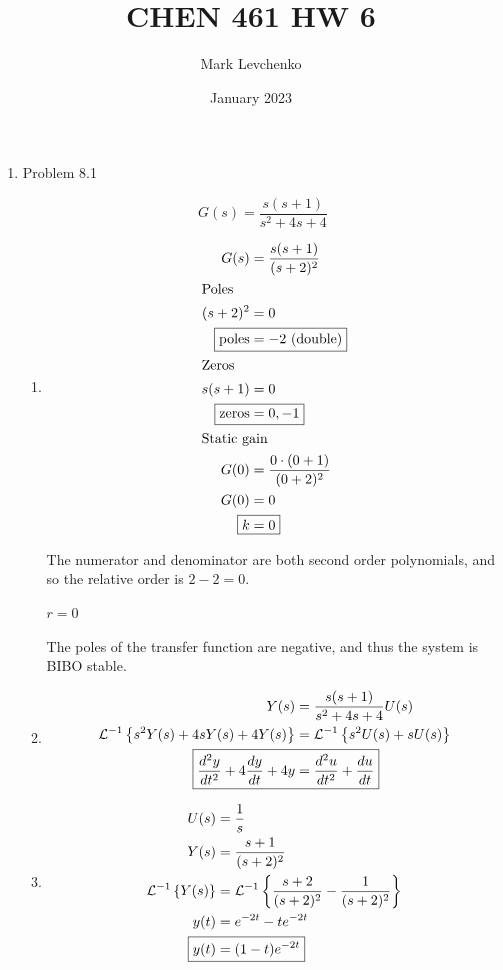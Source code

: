 \documentclass[12pt]{article}
\title{CHEN 461 HW 6}
\author{Mark Levchenko}
\date{January 2023}
\begin{document}
\begin{enumerate}

\newpage
    \item Problem 8.1
    
    \[
        G(s) = \frac{s (s + 1)}{s^2 + 4s + 4}  
    \]

    \begin{enumerate}
        \item 
        \begin{align*}
            G(s) &= \frac{s (s + 1)}{(s + 2)^2} \\
            \intertext{Poles}
            (s + 2)^2 &= 0 \\
            \Aboxed{\text{poles} &= -2 \text{ (double)}} \\
            \intertext{Zeros}
            s (s + 1) &= 0 \\
            \Aboxed{\text{zeros} &= 0, -1} \\
            \intertext{Static gain}
            G(0) &= \frac{0 \cdot (0 + 1)}{(0 + 2)^2} \\
            G(0) &= 0 \\
            \Aboxed{k &= 0}
        \end{align*}

        The numerator and denominator are both second order polynomials, and so the relative order is $2-2=0$.

        $\boxed{r=0}$

        The poles of the transfer function are negative, and thus the system is BIBO stable.

        \item 
        \begin{align*}
            Y(s) &= \frac{s (s + 1)}{s^2 + 4s + 4} U(s) \\
            \mathcal{L}^{-1} \left\{s^2 Y(s) + 4s Y(s) + 4 Y(s)\right\} &= \mathcal{L}^{-1} \left\{s^2 U(s) + s U(s)\right\} \\
            \Aboxed{\frac{d^2y}{dt^2} + 4 \frac{dy}{dt} + 4y &= \frac{d^2u}{dt^2} + \frac{du}{dt}}
        \end{align*}

        \item 
        \begin{align*}
            U(s) &= \frac{1}{s} \\
            Y(s) &= \frac{s + 1}{(s + 2)^2} \\
            \mathcal{L}^{-1} \left\{Y(s)\right\} &= \mathcal{L}^{-1} \left\{\frac{s + 2}{(s + 2)^2} - \frac{1}{(s + 2)^2}\right\} \\
            y(t) &= e^{-2t} - t e^{-2t} \\
            \Aboxed{y(t) &= (1 - t) e^{-2t}}
        \end{align*}


\end{enumerate}
\end{enumerate}
\end{document}
